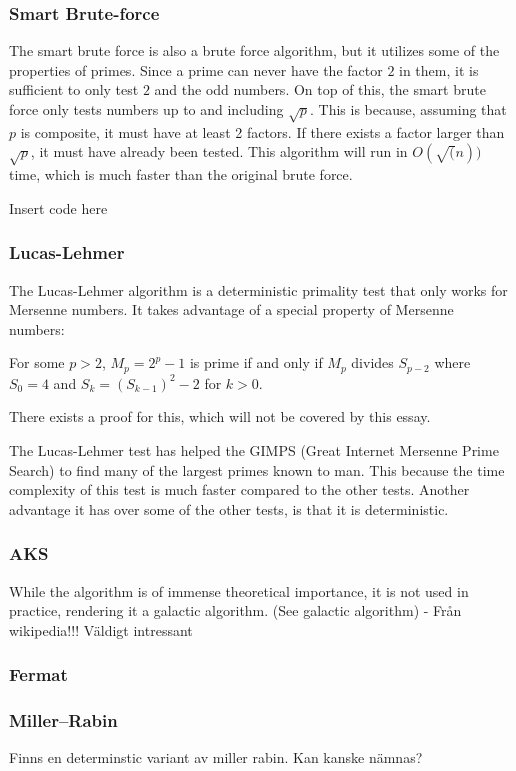 \documentclass[main.tex]{subfiles}
\begin{document}
\subsubsection{Smart Brute-force}
The smart brute force is also a brute force algorithm, but it utilizes some of the properties of primes. Since a prime can never have the factor $2$ in them, it is sufficient to only test $2$ and the odd numbers. On top of this, the smart brute force only tests numbers up to and including $\sqrt{p}$. This is because, assuming that $p$ is composite, it must have at least 2 factors. If there exists a factor larger than $\sqrt{p}$, it must have already been tested. This algorithm will run in $O(\sqrt(n))$ time, which is much faster than the original brute force.

\begin{python}
    Insert code here
\end{python}

\subsubsection{Lucas-Lehmer}
The Lucas-Lehmer algorithm is a deterministic primality test that only works for Mersenne numbers. It takes advantage of a special property of Mersenne numbers:

\begin{mdframed}
    For some $p>2$, $M_p=2^p-1$ is prime if and only if $M_p$ divides $S_{p-2}$ where $S_0=4$ and $S_k=(S_{k-1})^2-2$ for $k>0$. 
\end{mdframed}

There exists a proof for this, which will not be covered by this essay.

The Lucas-Lehmer test has helped the GIMPS (Great Internet Mersenne Prime Search) to find many of the largest primes known to man. This because the time complexity of this test is much faster compared to the other tests. Another advantage it has over some of the other tests, is that it is deterministic.

\subsubsection{AKS}
While the algorithm is of immense theoretical importance, it is not used in practice, rendering it a galactic algorithm. (See galactic algorithm)
- Från wikipedia!!! Väldigt intressant


\subsubsection{Fermat}

\subsubsection{Miller–Rabin}
Finns en determinstic variant av miller rabin. Kan kanske nämnas?
\end{document}

